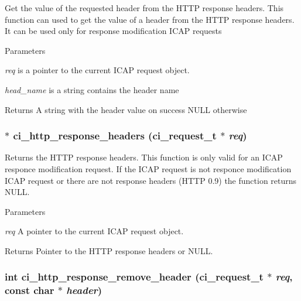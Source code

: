 Get the value of the requested header from the HTTP response headers. This function can used to get the value of a header from the HTTP response headers. It can be used only for response modification ICAP requests 
\begin{DoxyParams}{Parameters}
\item[{\em req}]is a pointer to the current ICAP request object. \item[{\em head\_\-name}]is a string contains the header name \end{DoxyParams}
\begin{DoxyReturn}{Returns}
A string with the header value on success NULL otherwise 
\end{DoxyReturn}
\hypertarget{group__HTTP_ga4572d0ede7cad4215c9fc2cb3a629b56}{
\subsubsection[{ci\_\-http\_\-response\_\-headers}]{$\ast$ ci\_\-http\_\-response\_\-headers ({\bf ci\_\-request\_\-t} $\ast$ {\em req})}}
\label{group__HTTP_ga4572d0ede7cad4215c9fc2cb3a629b56}


Returns the HTTP response headers. This function is only valid for an ICAP responce modification request. If the ICAP request is not responce modification ICAP request or there are not response headers (HTTP 0.9) the function returns NULL. 
\begin{DoxyParams}{Parameters}
\item[{\em req}]A pointer to the current ICAP request object. \end{DoxyParams}
\begin{DoxyReturn}{Returns}
Pointer to the HTTP response headers or NULL. 
\end{DoxyReturn}
\hypertarget{group__HTTP_gaba2bdcc434b345bf0488673e24c0e01c}{
\subsubsection[{ci\_\-http\_\-response\_\-remove\_\-header}]{\setlength{\rightskip}{0pt plus 5cm}int ci\_\-http\_\-response\_\-remove\_\-header ({\bf ci\_\-request\_\-t} $\ast$ {\em req}, \/  const char $\ast$ {\em header})}}
\label{group__HTTP_gaba2bdcc434b345bf0488673e24c0e01c}


